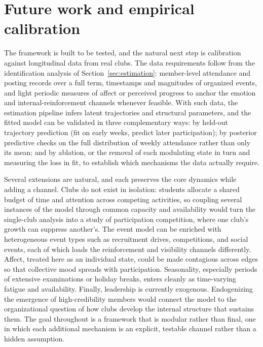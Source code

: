 \documentclass[11pt]{article}
\begin{document}
\section{Future work and empirical calibration}\label{sec:future}
The framework is built to be tested, and the natural next step is calibration against longitudinal data from real clubs. The data requirements follow from the identification analysis of Section~\ref{sec:estimation}: member-level attendance and posting records over a full term, timestamps and magnitudes of organized events, and light periodic measures of affect or perceived progress to anchor the emotion and internal-reinforcement channels whenever feasible. With such data, the estimation pipeline infers latent trajectories and structural parameters, and the fitted model can be validated in three complementary ways: by held-out trajectory prediction (fit on early weeks, predict later participation); by posterior predictive checks on the full distribution of weekly attendance rather than only its mean; and by ablation, or the removal of each modulating state in turn and measuring the loss in fit, to establish which mechanisms the data actually require.

Several extensions are natural, and each preserves the core dynamics while adding a channel. Clubs do not exist in isolation: students allocate a shared budget of time and attention across competing activities, so coupling several instances of the model through common capacity and availability would turn the single-club analysis into a study of participation competition, where one club's growth can suppress another's. The event model can be enriched with heterogeneous event types such as recruitment drives, competitions, and social events, each of which loads the reinforcement and visibility channels differently. Affect, treated here as an individual state, could be made contagious across edges so that collective mood spreads with participation. Seasonality, especially periods of extensive examinations or holiday breaks, enters cleanly as time-varying fatigue and availability. Finally, leadership is currently exogenous. Endogenizing the emergence of high-credibility members would connect the model to the organizational question of how clubs develop the internal structure that sustains them. The goal throughout is a framework that is modular rather than final, one in which each additional mechanism is an explicit, testable channel rather than a hidden assumption.
\end{document}
